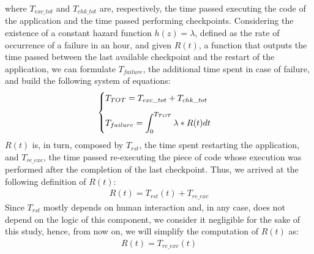 where \(T_{exc\_tot}\) and \(T_{chk\_tot}\) are, respectively, the time passed executing the code of the application and the time passed performing checkpoints. Considering the existence of a constant hazard function $h(z) = \lambda$, defined as the rate of occurrence of a failure in an hour, and given $R(t)$, a function that outputs the time passed between the last available checkpoint and the restart of the application, we can formulate $T_{failure}$, the additional time spent in case of failure, and build the following system of equations:  
\begin{align}\label{eq:2}
    \begin{cases}
    T_{TOT} = T_{exc\_tot} + T_{chk\_tot}\\
    \noalign{\vskip9pt}
    T_{failure} =  \displaystyle\int_0^{T_{TOT}}\lambda * R(t)dt
    \end{cases}
\end{align}
$R(t)$ is, in turn, composed by $T_{rst}$, the time spent restarting the application, and $T_{re\_exc}$, the time passed re-executing the piece of code whose execution was performed after the completion of the last checkpoint. Thus, we arrived at the following definition of $R(t)$:
\begin{align}\label{eq:3}
    R(t) = T_{rst}(t) + T_{re\_exc}
\end{align}
Since $T_{rst}$ mostly depends on human interaction and, in any case, does not depend on the logic of this component, we consider it negligible for the sake of this study, hence, from now on, we will simplify the computation of $R(t)$ as:
\begin{align}
    R(t) = T_{re\_exc}(t)
\end{align}

